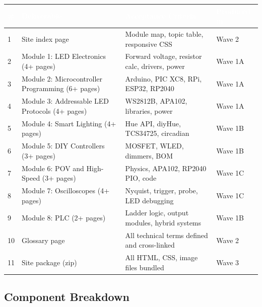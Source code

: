 \documentclass[11pt,letterpaper]{article}
\newcommand{\tableheader}[1]{\textbf{\sffamily\textcolor{white}{#1}}}
\begin{document}
\begin{center}
\begin{tabularx}{\textwidth}{C{0.5cm}L{4cm}XL{3cm}}
\toprule
{}
\tableheader{\#} & \tableheader{Deliverable} & \tableheader{Acceptance Criteria} & \tableheader{Produced in} \\
 & Site index page & Module map, topic table, responsive CSS & Wave 2 \\
2 & Module 1: LED Electronics (4+ pages) & Forward voltage, resistor calc, drivers, power & Wave 1A \\
3 & Module 2: Microcontroller Programming (6+ pages) & Arduino, PIC XC8, RPi, ESP32, RP2040 & Wave 1A \\
4 & Module 3: Addressable LED Protocols (4+ pages) & WS2812B, APA102, libraries, power & Wave 1A \\
5 & Module 4: Smart Lighting (4+ pages) & Hue API, diyHue, TCS34725, circadian & Wave 1B \\
6 & Module 5: DIY Controllers (3+ pages) & MOSFET, WLED, dimmers, BOM & Wave 1B \\
7 & Module 6: POV and High-Speed (3+ pages) & Physics, APA102, RP2040 PIO, code & Wave 1C \\
8 & Module 7: Oscilloscopes (4+ pages) & Nyquist, trigger, probe, LED debugging & Wave 1C \\
9 & Module 8: PLC (2+ pages) & Ladder logic, output modules, hybrid systems & Wave 1B \\
10 & Glossary page & All technical terms defined and cross-linked & Wave 2 \\
11 & Site package (zip) & All HTML, CSS, image files bundled & Wave 3 \\
\bottomrule
\end{tabularx}
\end{center}

\subsection{Component Breakdown}
\end{document}
